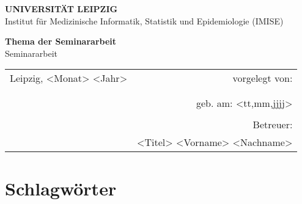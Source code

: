 \documentclass[headsepline,titlepage,twoside,12pt]{report}
\author{Vorname Name}
\newcommand\todo[1]{}%
\begin{document}
\allowdisplaybreaks%

\onehalfspace

\begin{titlepage}
\thispagestyle{empty}
\begin{center}

{\large\bf UNIVERSITÄT LEIPZIG\\[1mm]}
Institut für Medizinische Informatik, Statistik und Epidemiologie (IMISE)

\vspace*{4cm}

{\Huge\textbf{Thema der Seminararbeit}\\}
\vspace{0.5cm}
{\large Seminararbeit}\\
\vspace{2cm}
\todo{15--20 Seiten. Zwei Möglichkeiten:\\
(1) Vergleich, Zusammenfassung und \textbf{eigene} Bewertung zweier wissenschaftlicher Paper.\\
(2) Nutzenbewertung eines wissenschaftlichen Papers hinsichtlich einer konkreten Forschungssituation
}

\vspace*{4cm}

\begin{tabularx}{\textwidth}{lr}
Leipzig, <Monat> <Jahr>		&vorgelegt von:\\
\\
				&\makeatletter \@author \makeatother\\
				&geb. am: <tt,mm,jjjj>\\
\\
				&Betreuer:\\
				&<Titel> <Vorname> <Nachname>\\
\end{tabularx}
\vspace{1cm}

\end{center}
\end{titlepage}

\tableofcontents
\newpage

\section*{Schlagwörter}
\todo{
Verschlagworten Sie Ihre Seminararbeit.
Mindestens 3 Schlagworte.
Wenn möglich nutzen Sie dazu Begriffe aus der SNIK-Ontologie, inbesondere bei Arbeiten aus dem Bereich Management von Informationssystemen.
Sie finden die URLs über die Suche auf SNIK Graph unter \url{http://www.snik.eu/graph}.
Achten Sie auch in der Seminararbeit auf die Verwendung dieser Schlagworte.
Eine Anleitung dazu finden Sie in der Auftaktveranstaltung.
}
\end{document}
